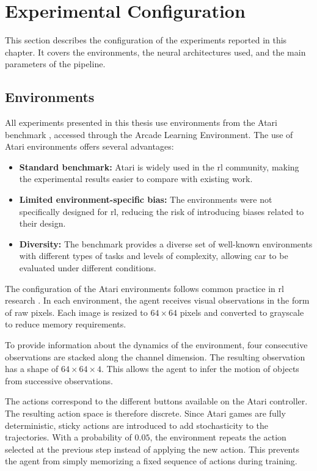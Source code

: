 \section{Experimental Configuration}
\label{sec:experiments_experimental_configuration}

This section describes the configuration of the experiments reported in this chapter.
It covers the environments, the neural architectures used, and the main parameters of the pipeline.

\subsection{Environments}

All experiments presented in this thesis use environments from the Atari benchmark \parencite{Bellemare_2013}, accessed through the Arcade Learning Environment.
The use of Atari environments offers several advantages:

\begin{itemize}
\item \textbf{Standard benchmark:} Atari is widely used in the \gls{rl} community, making the experimental results easier to compare with existing work.
\item \textbf{Limited environment-specific bias:} The environments were not specifically designed for \gls{rl}, reducing the risk of introducing biases related to their design.
\item \textbf{Diversity:} The benchmark provides a diverse set of well-known environments with different types of tasks and levels of complexity, allowing \gls{car} to be evaluated under different conditions.
\end{itemize}

The configuration of the Atari environments follows common practice in \gls{rl} research \parencite{machado2017revisitingarcadelearningenvironment}.
In each environment, the agent receives visual observations in the form of raw pixels.
Each image is resized to $64 \times 64$ pixels and converted to grayscale to reduce memory requirements.

To provide information about the dynamics of the environment, four consecutive observations are stacked along the channel dimension.
The resulting observation has a shape of $64 \times 64 \times 4$.
This allows the agent to infer the motion of objects from successive observations.

The actions correspond to the different buttons available on the Atari controller.
The resulting action space is therefore discrete.
Since Atari games are fully deterministic, sticky actions are introduced to add stochasticity to the trajectories.
With a probability of $0.05$, the environment repeats the action selected at the previous step instead of applying the new action.
This prevents the agent from simply memorizing a fixed sequence of actions during training.

